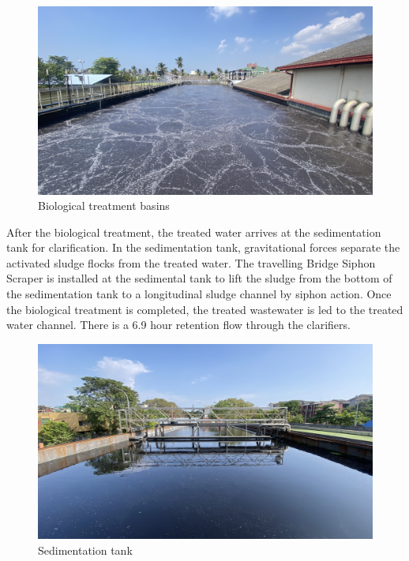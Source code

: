 \begin{figure}[H]
\centering
\includegraphics[width=1\linewidth]{material_and_methodology/Biological Treatment basins.JPG}
\caption{Biological treatment basins}
\label{fig:Biological_treatment_basins}
\end{figure}

After the biological treatment, the treated water arrives at the sedimentation tank for clarification. In the sedimentation tank, gravitational forces separate the activated sludge flocks from the treated water. The travelling Bridge Siphon Scraper is installed at the sedimental tank to lift the sludge from the bottom of the sedimentation tank to a longitudinal sludge channel by siphon action. Once the biological treatment is completed, the treated wastewater is led to the treated water channel. There is a 6.9 \unit{hour} retention flow through the clarifiers.

\begin{figure}[H]
\centering
\includegraphics[width=1\linewidth]{material_and_methodology/Sedimentation basin.jpg}
\caption{Sedimentation tank}
\label{fig:Sedimentation_tank}
\end{figure}
